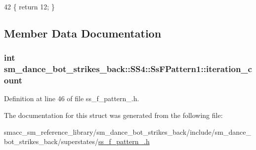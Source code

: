 \begin{DoxyCode}
42 \{ \textcolor{keywordflow}{return} 12; \}
\end{DoxyCode}


\subsection{Member Data Documentation}
\subsubsection[{\texorpdfstring{iteration\+\_\+count}{iteration_count}}]{\setlength{\rightskip}{0pt plus 5cm}int sm\+\_\+dance\+\_\+bot\+\_\+strikes\+\_\+back\+::\+S\+S4\+::\+Ss\+F\+Pattern1\+::iteration\+\_\+count}\hypertarget{structsm__dance__bot__strikes__back_1_1SS4_1_1SsFPattern1_a108e1b3fa97114d7d6a369a344ca21ea}{}\label{structsm__dance__bot__strikes__back_1_1SS4_1_1SsFPattern1_a108e1b3fa97114d7d6a369a344ca21ea}


Definition at line 46 of file ss\+\_\+f\+\_\+pattern\+\_.\+h.



The documentation for this struct was generated from the following file\+:\begin{DoxyCompactItemize}
\item 
smacc\+\_\+sm\+\_\+reference\+\_\+library/sm\+\_\+dance\+\_\+bot\+\_\+strikes\+\_\+back/include/sm\+\_\+dance\+\_\+bot\+\_\+strikes\+\_\+back/superstates/\hyperlink{strikes__back_2include_2sm__dance__bot__strikes__back_2superstates_2ss__f__pattern__1_8h}{ss\+\_\+f\+\_\+pattern\+\_.\+h}\end{DoxyCompactItemize}

